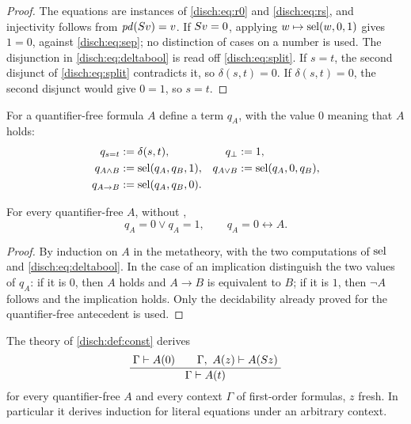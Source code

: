 \begin{proof}
The equations are instances of \eqref{disch:eq:r0} and
\eqref{disch:eq:rs}, and injectivity follows from
$\mathit{pd}(S v)=v$. If $S v=0$, applying $w\mapsto\operatorname{sel}(w,0,1)$
gives $1=0$, against \eqref{disch:eq:sep}; no distinction of cases on a
number is used. The disjunction in \eqref{disch:eq:deltabool} is read off
\eqref{disch:eq:split}. If $s=t$, the second disjunct of
\eqref{disch:eq:split} contradicts it, so $\delta(s,t)=0$. If
$\delta(s,t)=0$, the second disjunct would give $0=1$, so $s=t$.
\end{proof}

For a quantifier-free formula $A$ define a term $q_A$, with the value $0$
meaning that $A$ holds:
\begin{align*}
 q_{s=t}&\mathrel{:=}\delta(s,t), & q_\bot&\mathrel{:=} 1,\\
 q_{A\land B}&\mathrel{:=}\operatorname{sel}(q_A,q_B,1), &
 q_{A\lor B}&\mathrel{:=}\operatorname{sel}(q_A,0,q_B),\\
 q_{A\to B}&\mathrel{:=}\operatorname{sel}(q_A,q_B,0).
\end{align*}

\begin{lemma}
\label{disch:lem:const-bool}
For every quantifier-free $A$, without ,
\[
 q_A=0\lor q_A=1,\qquad q_A=0\leftrightarrow A .
\]
\end{lemma}

\begin{proof}
By induction on $A$ in the metatheory, with the two computations of
$\operatorname{sel}$ and \eqref{disch:eq:deltabool}. In the case of an implication
distinguish the two values of $q_A$: if it is $0$, then $A$ holds and
$A\to B$ is equivalent to $B$; if it is $1$, then $\neg A$ follows and the
implication holds. Only the decidability already proved for the
quantifier-free antecedent is used.
\end{proof}

\begin{theorem}
\label{disch:thm:const-ind}
The theory of \cref{disch:def:const} derives
\[
 \infrule{\Gamma\proves A(0)\qquad\Gamma,\ A(z)\proves A(\Suc z)}
         {\Gamma\proves A(t)}
\]
for every quantifier-free $A$ and every context $\Gamma$ of first-order
formulas, $z$ fresh. In particular it derives induction for literal
equations under an arbitrary context.
\end{theorem}

